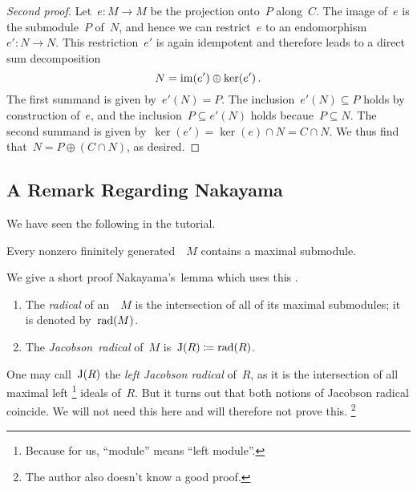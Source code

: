 \begin{proof}[Second proof]
  Let~$e \colon M \to M$ be the projection onto~$P$ along~$C$.
  The image of~$e$ is the submodule~$P$ of~$N$, and hence we can restrict~$e$ to an endomorphism~$e' \colon N \to N$.
  This restriction~$e'$ is again idempotent and therefore leads to a direct sum decomposition
  \[
      N
    = \operatorname{im}(e') \oplus \ker(e') \,.
  \]
  The first summand is given by~$e'(N) = P$.
  The inclusion~$e'(N) \subseteq P$ holds by construction of~$e$, and the inclusion~$P \subseteq e'(N)$ holds becaue~$P \subseteq N$.
  The second summand is given by~$\ker(e') = \ker(e) \cap N = C \cap N$.
  We thus find that~$N = P \oplus (C \cap N)$, as desired.
\end{proof}





\subsection*{A Remark Regarding Nakayama}

We have seen the following  in the tutorial.

\begin{lemma}
  \label{fg has maximal submodules}
  Every nonzero fininitely generated~{}~$M$ contains a maximal submodule.
\end{lemma}

We give a short proof Nakayama’s~lemma which uses this .

\begin{definition}
  \leavevmode
  \begin{enumerate}
    \item
      The \emph{radical} of an~{}~$M$ is the intersection of all of its maximal submodules;
      it is denoted by~$\operatorname{rad}(M)$.
    \item
      The \emph{Jacobson~radical} of~$M$ is~$\operatorname{J}(R) \coloneqq \operatorname{rad}(R)$.
  \end{enumerate}
\end{definition}

\begin{remark}
  One may call~$\operatorname{J}(R)$ the \emph{left Jacobson radical} of~$R$, as it is the intersection of all maximal left%
  \footnote{Because for us, \enquote{module} means \enquote{left module}.}
  ideals of~$R$.
  But it turns out that both notions of Jacobson radical coincide.
  We will not need this here and will therefore not prove this.%
  \footnote{The author also doesn’t know a good proof.}
\end{remark}


